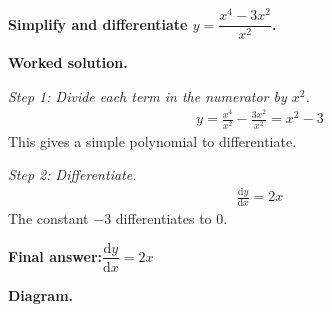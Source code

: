 \documentclass[11pt]{article}
\newcommand{\question}[1]{\par\medskip\noindent\textbf{#1}\par}
\begin{document}
\question{Simplify and differentiate \( y = \dfrac{x^4 - 3x^2}{x^2} \).}

\textbf{Worked solution.}

\textit{Step 1: Divide each term in the numerator by \( x^2 \).}
\[\begin{gathered}
y = \frac{x^4}{x^2} - \frac{3x^2}{x^2} = x^2 - 3
\end{gathered}\]
This gives a simple polynomial to differentiate.

\textit{Step 2: Differentiate.}
\[\begin{gathered}
\frac{\mathrm{d}y}{\mathrm{d}x} = 2x
\end{gathered}\]
The constant \(-3\) differentiates to \(0\).

\begin{answerbox}
\textbf{Final answer:}\quad \(\displaystyle  \dfrac{\mathrm{d}y}{\mathrm{d}x} = 2x \)
\end{answerbox}
\textbf{Diagram.}
\end{document}
